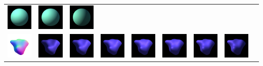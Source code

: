 \begin{center}
\begin{longtable}{@{}c@{}c@{}c@{}c@{}c@{}c@{}c@{}c@{}c@{}}
\includegraphics[width=0.1\linewidth]{training/35_5.png} & \includegraphics[width=0.1\linewidth]{training/35_6.png} &
\includegraphics[width=0.1\linewidth]{training/35_7.png} \\
\includegraphics[width=0.1\linewidth]{training/36_gt.png} & \includegraphics[width=0.1\linewidth]{training/36_0.png} &
\includegraphics[width=0.1\linewidth]{training/36_1.png} & \includegraphics[width=0.1\linewidth]{training/36_2.png} &
\includegraphics[width=0.1\linewidth]{training/36_3.png} & \includegraphics[width=0.1\linewidth]{training/36_4.png} &
\includegraphics[width=0.1\linewidth]{training/36_5.png} & \includegraphics[width=0.1\linewidth]{training/36_6.png} &

\end{longtable}
\end{center}
